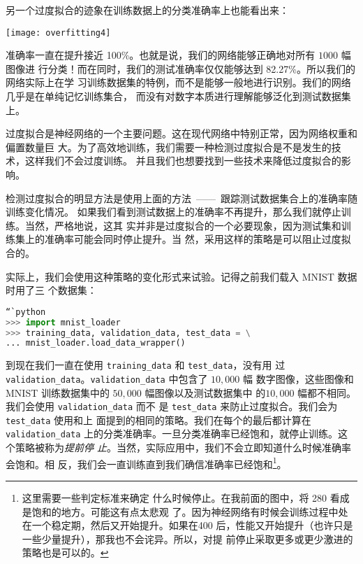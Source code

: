 另一个过度拟合的迹象在训练数据上的分类准确率上也能看出来：
\begin{center}
  \texttt{[image: overfitting4]}
\end{center}

准确率一直在提升接近 100\%。也就是说，我们的网络能够正确地对所有 $1000$ 幅图像进
行分类！而在同时，我们的测试准确率仅仅能够达到 82.27\%。所以我们的网络实际上在学
习训练数据集的特例，而不是能够一般地进行识别。我们的网络几乎是在单纯记忆训练集合，
而没有对数字本质进行理解能够泛化到测试数据集上。

过度拟合是神经网络的一个主要问题。这在现代网络中特别正常，因为网络权重和偏置数量巨
大。为了高效地训练，我们需要一种检测过度拟合是不是发生的技术，这样我们不会过度训练。
并且我们也想要找到一些技术来降低过度拟合的影响。

检测过度拟合的明显方法是使用上面的方法~——~跟踪测试数据集合上的准确率随训练变化情况。
如果我们看到测试数据上的准确率不再提升，那么我们就停止训练。当然，严格地说，这其
实并非是过度拟合的一个必要现象，因为测试集和训练集上的准确率可能会同时停止提升。当
然，采用这样的策略是可以阻止过度拟合的。

实际上，我们会使用这种策略的变化形式来试验。记得之前我们载入 MNIST 数据时用了三
个数据集：

\begin{lstlisting}[language=Python]
“`python
>>> import mnist_loader
>>> training_data, validation_data, test_data = \
... mnist_loader.load_data_wrapper()
\end{lstlisting}

到现在我们一直在使用 \lstinline!training_data! 和 \lstinline!test_data!，没有用
过 \lstinline!validation_data!。\lstinline!validation_data! 中包含了 $10,000$ 幅
数字图像，这些图像和 MNIST 训练数据集中的 $50,000$ 幅图像以及测试数据集中
的$10,000$ 幅都不相同。我们会使用 \lstinline!validation_data! 而不
是 \lstinline!test_data! 来防止过度拟合。我们会为 \lstinline!test_data! 使用和上
面提到的相同的策略。我们在每个\epoch{}的最后都计算在 \lstinline!validation_data!
上的分类准确率。一旦分类准确率已经饱和，就停止训练。这个策略被称为\emph{提前停
  止}。当然，实际应用中，我们不会立即知道什么时候准确率会饱和。相
反，我们会一直训练直到我们确信准确率已经饱和\footnote{这里需要一些判定标准来确定
  什么时候停止。在我前面的图中，将 280 \epoch{}看成是饱和的地方。可能这有点太悲观
  了。因为神经网络有时候会训练过程中处在一个稳定期，然后又开始提升。如果在400
  \epoch{}后，性能又开始提升（也许只是一些少量提升），那我也不会诧异。所以，对提
  前停止采取更多或更少激进的策略也是可以的。}。

